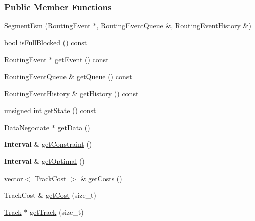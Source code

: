 \subsubsection*{Public Member Functions}
\begin{DoxyCompactItemize}
\item 
\mbox{\hyperlink{classKite_1_1SegmentFsm_a2a8eadaaf3ed213914e7b4a81cae6e6a}{Segment\+Fsm}} (\mbox{\hyperlink{classKite_1_1RoutingEvent}{Routing\+Event}} $\ast$, \mbox{\hyperlink{classKite_1_1RoutingEventQueue}{Routing\+Event\+Queue}} \&, \mbox{\hyperlink{classKite_1_1RoutingEventHistory}{Routing\+Event\+History}} \&)
\item 
bool \mbox{\hyperlink{classKite_1_1SegmentFsm_a90fb28e997bec986238b81c0316319f0}{is\+Full\+Blocked}} () const
\item 
\mbox{\hyperlink{classKite_1_1RoutingEvent}{Routing\+Event}} $\ast$ \mbox{\hyperlink{classKite_1_1SegmentFsm_a513f39c546ef4be0d13787cdace4eadf}{get\+Event}} () const
\item 
\mbox{\hyperlink{classKite_1_1RoutingEventQueue}{Routing\+Event\+Queue}} \& \mbox{\hyperlink{classKite_1_1SegmentFsm_a3e86badede6ba842280779cecea21e81}{get\+Queue}} () const
\item 
\mbox{\hyperlink{classKite_1_1RoutingEventHistory}{Routing\+Event\+History}} \& \mbox{\hyperlink{classKite_1_1SegmentFsm_a1bf115c7f375168ec89ec400d58440b4}{get\+History}} () const
\item 
unsigned int \mbox{\hyperlink{classKite_1_1SegmentFsm_a40ec2b23684a0e6e6d7ac9783a269037}{get\+State}} () const
\item 
\mbox{\hyperlink{classKite_1_1DataNegociate}{Data\+Negociate}} $\ast$ \mbox{\hyperlink{classKite_1_1SegmentFsm_ad272e2f3fbbddcd6c8dc2f0187f08c4e}{get\+Data}} ()
\item 
\textbf{ Interval} \& \mbox{\hyperlink{classKite_1_1SegmentFsm_abf6603c742bee65a4effa24135f2d955}{get\+Constraint}} ()
\item 
\textbf{ Interval} \& \mbox{\hyperlink{classKite_1_1SegmentFsm_a9d1a7f4108b49d3096d8c733fabe60f3}{get\+Optimal}} ()
\item 
vector$<$ Track\+Cost $>$ \& \mbox{\hyperlink{classKite_1_1SegmentFsm_ab7144079976c8808e69f9aac68dda06d}{get\+Costs}} ()
\item 
Track\+Cost \& \mbox{\hyperlink{classKite_1_1SegmentFsm_a5256595f77ebc80c3ee683cfdbc7f8f6}{get\+Cost}} (size\+\_\+t)
\item 
\mbox{\hyperlink{classKite_1_1Track}{Track}} $\ast$ \mbox{\hyperlink{classKite_1_1SegmentFsm_af2d9a3a5df8a4de5d263fb3fae563a8a}{get\+Track}} (size\+\_\+t)

\end{DoxyCompactItemize}
